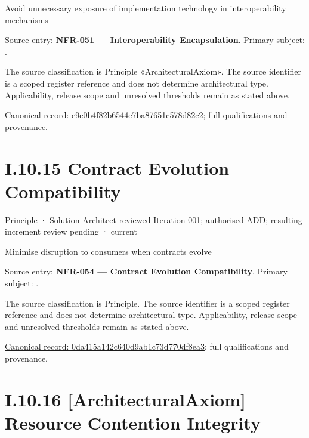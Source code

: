 Avoid unnecessary exposure of implementation technology in interoperability mechanisms



Source entry: \textbf{NFR-051 — Interoperability Encapsulation}. Primary subject: \texttt{}.



The source classification is Principle «ArchitecturalAxiom». The source identifier is a scoped register reference and does not determine architectural type. Applicability, release scope and unresolved thresholds remain as stated above.


{\footnotesize \href{../../../../../../../../continuum/motivation/principle/architectural-axiom/e9e0b4f82b6544e7ba87651c578d82c2.md}{Canonical record: e9e0b4f82b6544e7ba87651c578d82c2}; full qualifications and provenance.}\par
\section*{I.10.15 Contract Evolution Compatibility}
\label{navigation:I.10.15}

\label{element:0da415a142c640d9ab1c73d770df8ea3}
{\small Principle · Solution Architect-reviewed Iteration 001; authorised ADD; resulting increment review pending · current}\par

Minimise disruption to consumers when contracts evolve



Source entry: \textbf{NFR-054 — Contract Evolution Compatibility}. Primary subject: \texttt{}.



The source classification is Principle. The source identifier is a scoped register reference and does not determine architectural type. Applicability, release scope and unresolved thresholds remain as stated above.


{\footnotesize \href{../../../../../../../../continuum/motivation/principle/0da415a142c640d9ab1c73d770df8ea3.md}{Canonical record: 0da415a142c640d9ab1c73d770df8ea3}; full qualifications and provenance.}\par
\section*{I.10.16 [ArchitecturalAxiom] Resource Contention Integrity}
\label{navigation:I.10.16}

